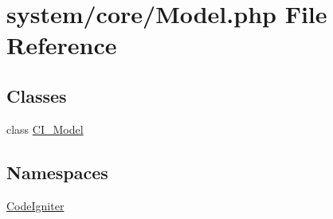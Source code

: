 \hypertarget{_model_8php}{}\section{system/core/\+Model.php File Reference}
\label{_model_8php}
\subsection*{Classes}
\begin{DoxyCompactItemize}
\item 
class \mbox{\hyperlink{class_c_i___model}{C\+I\+\_\+\+Model}}
\end{DoxyCompactItemize}
\subsection*{Namespaces}
\begin{DoxyCompactItemize}
\item 
 \mbox{\hyperlink{namespace_code_igniter}{Code\+Igniter}}
\end{DoxyCompactItemize}
